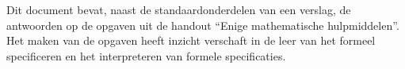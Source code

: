 
Dit document bevat, naast de standaardonderdelen van een verslag, de antwoorden op de opgaven uit
de handout ``Enige mathematische hulpmiddelen''. Het maken van de opgaven heeft inzicht verschaft
in de leer van het formeel specificeren en het interpreteren van formele specificaties.
